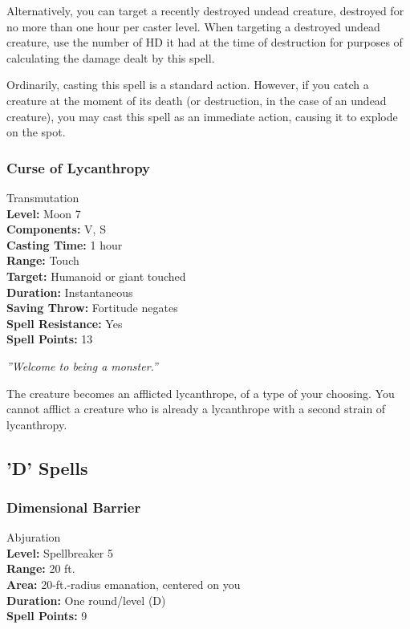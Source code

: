 Alternatively, you can target a recently destroyed undead creature, destroyed for no more than one hour per caster level. When targeting a destroyed undead creature, use the number of HD it had at the time of destruction for purposes of calculating the damage dealt by this spell.

Ordinarily, casting this spell is a standard action. However, if you catch a creature at the moment of its death (or destruction, in the case of an undead creature), you may cast this spell as an immediate action, causing it to explode on the spot.

\subsubsection{Curse of Lycanthropy}
\label{Spell:CurseOfLycanthropy}
Transmutation
\\ \textbf{Level:} Moon 7
\\ \textbf{Components:} V, S
\\ \textbf{Casting Time:} 1 hour
\\ \textbf{Range:} Touch
\\ \textbf{Target:} Humanoid or giant touched
\\ \textbf{Duration:} Instantaneous
\\ \textbf{Saving Throw:} Fortitude negates
\\ \textbf{Spell Resistance:} Yes
\\ \textbf{Spell Points:} 13

\emph{''Welcome to being a monster.''}

The creature becomes an afflicted lycanthrope, of a type of your choosing. You cannot afflict a creature who is already a lycanthrope with a second strain of lycanthropy.
\subsection{'D' Spells}

\subsubsection{Dimensional Barrier}
\label{Spell:DimensionalBarrier}
Abjuration
\\ \textbf{Level:} Spellbreaker 5
\\ \textbf{Range:} 20 ft.
\\ \textbf{Area:} 20-ft.-radius emanation, centered on you
\\ \textbf{Duration:} One round/level (D)
\\ \textbf{Spell Points:} 9

